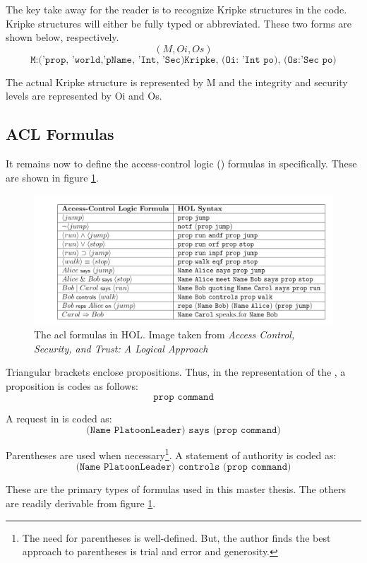 \documentclass[../../main/main.tex]{subfiles}
\begin{document}
The key take away for the reader is to recognize Kripke structures in the  code.  Kripke structures will either be fully typed or abbreviated.  These two forms are shown below, respectively.  
\[ (M, Oi, Os) \]
\[ \texttt{M:('prop, 'world,'pName, 'Int, 'Sec)Kripke, (Oi: 'Int po), (Os:'Sec po)} \]

The actual Kripke structure is represented by M and the integrity and security levels are represented by Oi and Os.  

\subsection{ACL Formulas}
It remains now to define the access-control logic () formulas in  specifically.  These are shown in figure \ref{aclformulasHOL}.

\begin{figure}[h]
\centering
\includegraphics[width=\textwidth]{../figures/aclformulasHOL}
\caption{\label{aclformulasHOL}The \gls{acl} formulas in HOL.  Image taken from \textit{Access Control, Security, and Trust: A Logical Approach}\cite{ChinOlder}}
\end{figure}


Triangular brackets enclose propositions.  Thus, in the  representation of the , a proposition is codes as follows:
\[\texttt{prop command} \]

A request in  is coded as: 
\[ \texttt{(Name PlatoonLeader) says (prop command)} \]

Parentheses are used when necessary\footnote{The need for parentheses is well-defined.  But, the author finds the best approach to parentheses is trial and error and generosity.}.  A statement of authority is coded as:
\[ \texttt{(Name PlatoonLeader) controls (prop command)} \]

These are the primary types of  formulas used in this master thesis.  The others are readily derivable from figure \ref{aclformulasHOL}.
\end{document}
